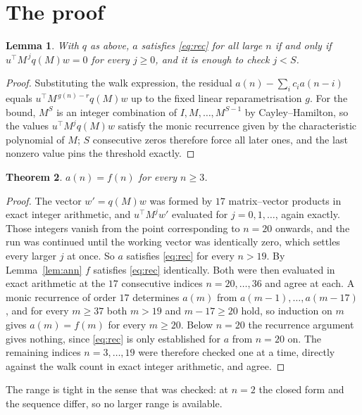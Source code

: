 \documentclass[11pt,a4paper]{article}
\theoremstyle{plain}
\newtheorem{theorem}{Theorem}
\newtheorem{lemma}[theorem]{Lemma}
\theoremstyle{definition}
\begin{document}
\section{The proof}

\begin{lemma}\label{lem:crit}
With $q$ as above, $a$ satisfies \eqref{eq:rec} for all large $n$ if and only if
$u^{\!\top}M^{\,j}q(M)w=0$ for every $j\ge0$, and it is enough to check $j<S$.
\end{lemma}

\begin{proof}
Substituting the walk expression, the residual $a(n)-\sum_ic_ia(n-i)$ equals
$u^{\!\top}M^{\,g(n)-r}q(M)w$ up to the fixed linear reparametrisation $g$. For the bound,
$M^{S}$ is an integer combination of $I,M,\dots,M^{S-1}$ by Cayley--Hamilton, so the values
$u^{\!\top}M^{j}q(M)w$ satisfy the monic recurrence given by the characteristic polynomial of
$M$; $S$ consecutive zeros therefore force all later ones, and the last nonzero value pins the
threshold exactly.
\end{proof}

\begin{theorem}
$a(n)=f(n)$ for every $n\ge3$.
\end{theorem}

\begin{proof}
The vector $w'=q(M)w$ was formed by $17$ matrix--vector products in exact integer
arithmetic, and $u^{\!\top}M^{j}w'$ evaluated for $j=0,1,\dots$, again exactly. Those integers
vanish from the point corresponding to $n=20$ onwards, and the run was continued until the
working vector was identically zero, which settles every larger $j$ at once. So $a$ satisfies
\eqref{eq:rec} for every $n>19$. By Lemma~\ref{lem:ann} $f$ satisfies \eqref{eq:rec}
identically. Both were then evaluated in exact arithmetic at the $17$ consecutive indices
$n=20,\dots,36$ and agree at each. A monic recurrence of order $17$
determines $a(m)$ from $a(m-1),\dots,a(m-17)$, and for every $m\ge37$ both
$m>19$ and $m-17\ge20$ hold, so induction on $m$ gives $a(m)=f(m)$ for every
$m\ge20$.
Below $n=20$ the recurrence argument gives nothing, since \eqref{eq:rec} is only
established for $a$ from $n=20$ on. The remaining indices $n=3,\dots,19$ were
therefore checked one at a time, directly against the walk count in exact integer arithmetic,
and agree.
\end{proof}

The range is tight in the sense that was checked: at $n=2$ the closed form and the sequence differ, so no larger range is available.
\end{document}
